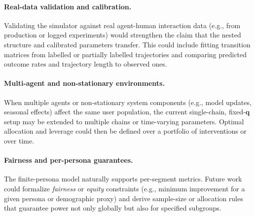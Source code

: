 \paragraph{Real-data validation and calibration.}
Validating the simulator against real agent-human interaction data (e.g., from production or logged experiments) would strengthen the claim that the nested structure and calibrated parameters transfer. This could include fitting transition matrices from labelled or partially labelled trajectories and comparing predicted outcome rates and trajectory length to observed ones.

\paragraph{Multi-agent and non-stationary environments.}
When multiple agents or non-stationary system components (e.g., model updates, seasonal effects) affect the same user population, the current single-chain, fixed-$\mathbf{q}$ setup may be extended to multiple chains or time-varying parameters. Optimal allocation and leverage could then be defined over a portfolio of interventions or over time.

\paragraph{Fairness and per-persona guarantees.}
The finite-persona model naturally supports per-segment metrics. Future work could formalize \emph{fairness} or \emph{equity} constraints (e.g., minimum improvement for a given persona or demographic proxy) and derive sample-size or allocation rules that guarantee power not only globally but also for specified subgroups.
